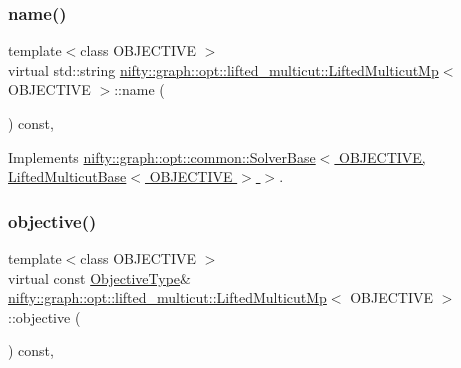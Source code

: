 \subsubsection{\texorpdfstring{name()}{name()}}
{\footnotesize\ttfamily template$<$class O\+B\+J\+E\+C\+T\+I\+VE $>$ \\
virtual std\+::string \hyperlink{classnifty_1_1graph_1_1opt_1_1lifted__multicut_1_1LiftedMulticutMp}{nifty\+::graph\+::opt\+::lifted\+\_\+multicut\+::\+Lifted\+Multicut\+Mp}$<$ O\+B\+J\+E\+C\+T\+I\+VE $>$\+::name (\begin{DoxyParamCaption}{ }\end{DoxyParamCaption}) const\hspace{0.3cm}{\ttfamily [inline]}, {\ttfamily [virtual]}}



Implements \hyperlink{classnifty_1_1graph_1_1opt_1_1common_1_1SolverBase_af638b9a804cfec3e35fe87c77e942d30}{nifty\+::graph\+::opt\+::common\+::\+Solver\+Base$<$ O\+B\+J\+E\+C\+T\+I\+V\+E, Lifted\+Multicut\+Base$<$ O\+B\+J\+E\+C\+T\+I\+V\+E $>$ $>$}.

\mbox{\label{classnifty_1_1graph_1_1opt_1_1lifted__multicut_1_1LiftedMulticutMp_af2324c385248f1400e25c90adb80a7b5}} 
\subsubsection{\texorpdfstring{objective()}{objective()}}
{\footnotesize\ttfamily template$<$class O\+B\+J\+E\+C\+T\+I\+VE $>$ \\
virtual const \hyperlink{classnifty_1_1graph_1_1opt_1_1lifted__multicut_1_1LiftedMulticutMp_a7946ba353b86ff043eff57fd75513b81}{Objective\+Type}\& \hyperlink{classnifty_1_1graph_1_1opt_1_1lifted__multicut_1_1LiftedMulticutMp}{nifty\+::graph\+::opt\+::lifted\+\_\+multicut\+::\+Lifted\+Multicut\+Mp}$<$ O\+B\+J\+E\+C\+T\+I\+VE $>$\+::objective (\begin{DoxyParamCaption}{ }\end{DoxyParamCaption}) const\hspace{0.3cm}{\ttfamily [inline]}, {\ttfamily [virtual]}}



